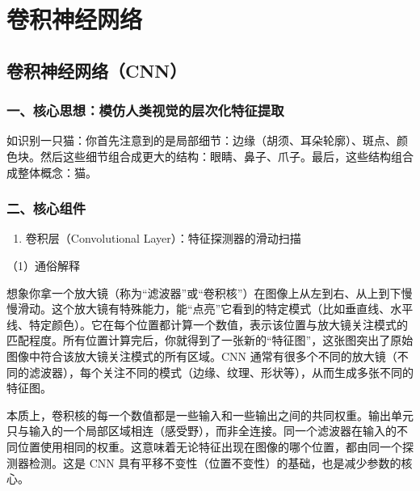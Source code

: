 \hypertarget{ux5377ux79efux795eux7ecfux7f51ux7edc}{%
\chapter{卷积神经网络}\label{ux5377ux79efux795eux7ecfux7f51ux7edc}}

\hypertarget{ux5377ux79efux795eux7ecfux7f51ux7edccnn}{%
\section{卷积神经网络（CNN）}\label{ux5377ux79efux795eux7ecfux7f51ux7edccnn}}

\hypertarget{ux4e00ux6838ux5fc3ux601dux60f3ux6a21ux4effux4ebaux7c7bux89c6ux89c9ux7684ux5c42ux6b21ux5316ux7279ux5f81ux63d0ux53d6}{%
\subsection{一、核心思想：模仿人类视觉的层次化特征提取}\label{ux4e00ux6838ux5fc3ux601dux60f3ux6a21ux4effux4ebaux7c7bux89c6ux89c9ux7684ux5c42ux6b21ux5316ux7279ux5f81ux63d0ux53d6}}

如识别一只猫：你首先注意到的是局部细节：边缘（胡须、耳朵轮廓）、斑点、颜色块。然后这些细节组合成更大的结构：眼睛、鼻子、爪子。最后，这些结构组合成整体概念：猫。

\hypertarget{ux4e8cux6838ux5fc3ux7ec4ux4ef6}{%
\subsection{二、核心组件}\label{ux4e8cux6838ux5fc3ux7ec4ux4ef6}}

\begin{enumerate}
\def\labelenumi{\arabic{enumi}.}
\tightlist
\item
  卷积层（Convolutional Layer）：特征探测器的滑动扫描
\end{enumerate}

（1）通俗解释

想象你拿一个放大镜（称为``滤波器''或``卷积核''）在图像上从左到右、从上到下慢慢滑动。这个放大镜有特殊能力，能``点亮''它看到的特定模式（比如垂直线、水平线、特定颜色）。它在每个位置都计算一个数值，表示该位置与放大镜关注模式的匹配程度。所有位置计算完后，你就得到了一张新的``特征图''，这张图突出了原始图像中符合该放大镜关注模式的所有区域。CNN 通常有很多个不同的放大镜（不同的滤波器），每个关注不同的模式（边缘、纹理、形状等），从而生成多张不同的特征图。

本质上，卷积核的每一个数值都是一些输入和一些输出之间的共同权重。输出单元只与输入的一个局部区域相连（感受野），而非全连接。同一个滤波器在输入的不同位置使用相同的权重。这意味着无论特征出现在图像的哪个位置，都由同一个探测器检测。这是 CNN 具有平移不变性（位置不变性）的基础，也是减少参数的核心。

